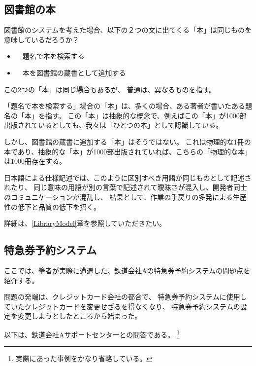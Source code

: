 \subsection {図書館の本}

	図書館のシステムを考えた場合、以下の２つの文に出てくる「本」は同じものを意味しているだろうか？

\begin{itemize}
	\item　題名で本を検索する
	\item　本を図書館の蔵書として追加する
\end{itemize} 

	この2つの「本」は同じ場合もあるが、
	普通は、異なるものを指す。

	「題名で本を検索する」場合の「本」は、多くの場合、ある著者が書いたある題名の「本」を指す。
	この「本」は抽象的な概念で、例えばこの「本」が1000部出版されているとしても、我々は「ひとつの本」として認識している。

	しかし、図書館の蔵書に追加する「本」はそうではない。
	これは物理的な1冊の本であり、抽象的な「本」が1000部出版されていれば、こちらの「物理的な本」は1000冊存在する。

	日本語による仕様記述では、このように区別すべき用語が同じものとして記述されたり、
	同じ意味の用語が別の言葉で記述されて曖昧さが混入し、開発者同士のコミュニケーションが混乱し、
	結果として、作業の手戻りの多発による生産性の低下と品質の低下を招く。

	詳細は、\ref{LibraryModel}章を参照していただきたい。

\subsection {特急券予約システム}

	ここでは、筆者が実際に遭遇した、鉄道会社Aの特急券予約システムの問題点を紹介する。

	問題の発端は、クレジットカード会社の都合で、
	特急券予約システムに使用していたクレジットカードを変更せざるを得なくなり、
	特急券予約システムの設定を変更しようとしたところから始まった。

	以下は、鉄道会社Aサポートセンターとの問答である。
	\footnote{実際にあった事例をかなり省略している。}

